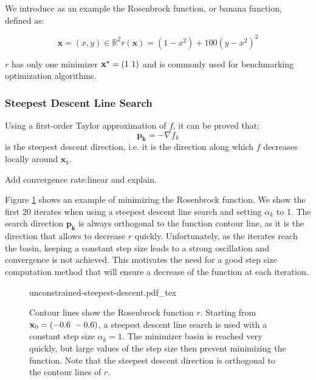 We introduce as an example the Rosenbrock function, or banana
function, defined as:

\begin{equation}
\mathbf{x} = (x,y) \in \mathbb R^2 r(\mathbf{x}) =
(1-x^2)+100(y-x^2)^2
\end{equation}

$r$ has only one minimizer $\mathbf{x}^{\star} = (1~1)$ and is commonly
used for benchmarking optimization algorithms.

\subsubsection{Steepest Descent Line Search}

Using a first-order Taylor approximation of $f$, it can be proved that:
\begin{equation}
\mathbf{p_k} = -\nabla f_k
\end{equation}
is the steepest descent direction, i.e. it is the direction along
which $f$ decreases locally around $\mathbf{x}_k$.

Add convergence rate:linear and explain.

Figure \ref{fig:chap3-unconstrained-steepest-descent} shows an example
of minimizing the Rosenbrock function. We show the first 20 iterates
when using a steepest descent line search and setting $\alpha_k$ to
1. The search direction $\mathbf{p_k}$ is always orthogonal to the
function contour line, as it is the direction that allows to decrease
$r$ quickly. Unfortunately, as the iterates reach the basin, keeping a
constant step size leads to a strong oscillation and convergence is
not achieved. This motivates the need for a good step size computation
method that will ensure a decrease of the function at each iteration.

\begin{figure}[h!]
  \centering
      {\def\svgwidth{0.8\linewidth}
        {\footnotesize
          
                     {unconstrained-steepest-descent.pdf_tex}
        }
      }
      \caption{Contour lines show the Rosenbrock function
        $r$. Starting from $\mathbf{x}_0=(-0.6~-0.6)$, a steepest
        descent line search is used with a constant step size
        $\alpha_k=1$. The minimizer basin is reached very quickly,
        but large values of the step size then prevent minimizing the
        function. Note that the steepest descent direction is
        orthogonal to the contour lines of $r$.}
      \label{fig:chap3-unconstrained-steepest-descent}
\end{figure}


